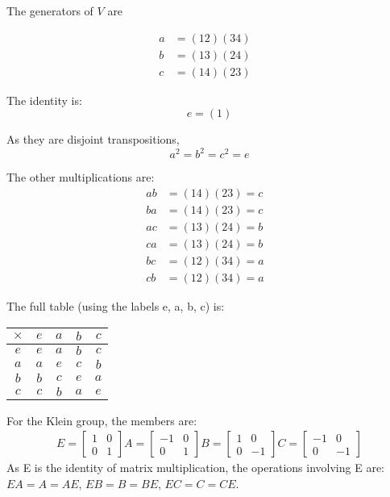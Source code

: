 \documentclass[11pt,oneside]{article}
\numberwithin{equation}{section}
\theoremstyle{definition}
\begin{document}
\begin{solution}
  The generators of $V$ are

  \begin{align*}
    a & = (1 2) ( 3 4) & \\
    b & = (1 3) ( 2 4) & \\
    c & = (1 4) ( 2 3)
  \end{align*}

  The identity is:
  $$
    e = (1)
  $$
  
  As they are disjoint transpositions,
  $$
  a^2 = b ^ 2 = c ^ 2 = e
  $$
  
  The other multiplications are:
  \begin{align*}
    a b & = (1 4 ) ( 2 3) = c & \\
    b a & = (1 4 ) ( 2 3)  = c & \\
    a c & = (1 3) (2 4) = b & \\
    c a & = (1 3) (2 4)  = b & \\
    b c & = (1 2) (3 4) = a& \\
    c b & = (1 2) (3 4) = a
  \end{align*}

  The full table (using the labels e, a, b, c) is:

  \begin{center}
    \begin{tabular}{ |c|c|c|c|c| }
      \hline
          {$\times$} & $e$ & $a$ & $b$ & $c$ \\
          \hline
          $e$      & $e$ & $a$ & $b$ & $c$ \\
          $a$      & $a$ & $e$ & $c$ & $b$ \\
          $b$      & $b$ & $c$ & $e$ & $a$ \\
          $c$      & $c$ & $b$ & $a$ & $e$ \\
          \hline
    \end{tabular}
  \end{center}

  For the Klein group, the members are:
  \begin{align*}
    E = \begin{bmatrix} 1 & 0 \\
                        0 & 1 
    \end{bmatrix}
    A = \begin{bmatrix} -1 & 0 \\
                        0 & 1 
    \end{bmatrix}
    B = \begin{bmatrix} 1 & 0 \\
                        0 & -1 
    \end{bmatrix}
    C = \begin{bmatrix} -1 & 0 \\
                        0 & -1 
    \end{bmatrix}
  \end{align*}
  As E is the identity of matrix multiplication, the operations involving E are: 
$ E  A = A = A E$, $ E B = B = B E$, $E C = C = C E$.  


\end{solution}
\end{document}
